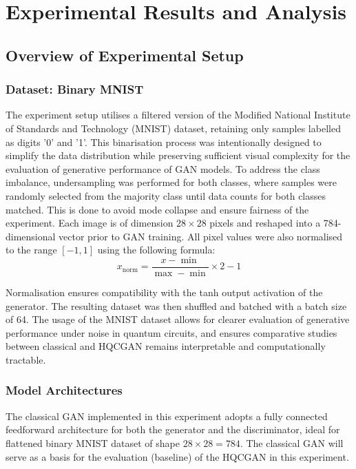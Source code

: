 
\chapter{Experimental Results and Analysis}
\label{ch:rice}
\vspace{2em}

\section{Overview of Experimental Setup}
\subsection{Dataset: Binary MNIST}
The experiment setup utilises a filtered version of the Modified National Institute of Standards and Technology (MNIST) dataset, retaining only samples labelled as digits '0' and '1'. This binarisation process was intentionally designed to simplify the data distribution while preserving sufficient visual complexity for the evaluation of generative performance of GAN models. To address the class imbalance, undersampling was performed for both classes, where samples were randomly selected from the majority class until data counts for both classes matched. This is done to avoid mode collapse and ensure fairness of the experiment. Each image is of dimension $28 \times 28$ pixels and reshaped into a 784-dimensional vector prior to GAN training. All pixel values were also normalised to the range $[-1, 1]$ using the following formula:
\begin{equation}
x_{\text{norm}} = \frac{x - \min}{\max - \min} \times 2 - 1
\end{equation}

Normalisation ensures compatibility with the tanh output activation of the generator. The resulting dataset was then shuffled and batched with a batch size of 64. The usage of the MNIST dataset allows for clearer evaluation of generative performance under noise in quantum circuits, and ensures comparative studies between classical and HQCGAN remains interpretable and computationally tractable.

\subsection{Model Architectures}

The classical GAN implemented in this experiment adopts a fully connected feedforward architecture for both the generator and the discriminator, ideal for flattened binary MNIST dataset of shape $28 \times 28 = 784$. The classical GAN will serve as a basis for the evaluation (baseline) of the HQCGAN in this experiment.

